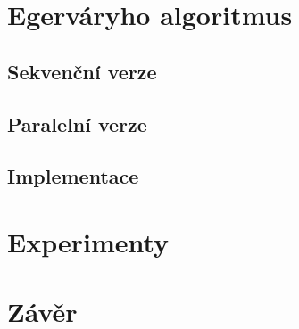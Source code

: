 \documentclass[a4paper, 11pt, titlepage, final]{article}[3. prosinec 2011]
\begin{document}
\section{Egerváryho algoritmus}

\subsection{Sekvenční verze}

\subsection{Paralelní verze}

\subsection{Implementace}

\section{Experimenty}

\section{Závěr}

\end{document}
